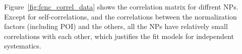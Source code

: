 
Figure~\ref{fig:fcnc_correl_data} shows the correlation matrix for diffrent NPs. Except for self-correlations, and the correlations between the normalization factors (including POI) and the others, all the NPs have relatively small correlations with each other, which justifies the fit models for independent systematics. %


%


